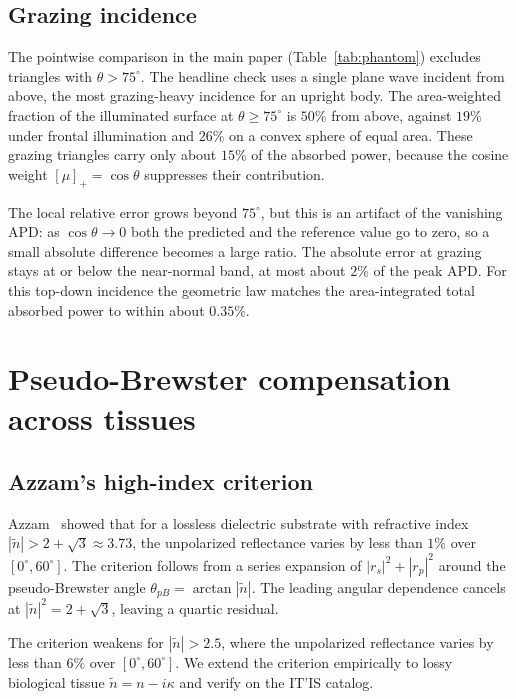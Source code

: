 \documentclass[journal,twocolumn,10pt]{IEEEtran}
\theoremstyle{plain}
\theoremstyle{remark}
\newcommand{\APD}{\mathrm{APD}}
\newcommand{\ntilde}{\tilde{n}}
\newcommand{\pospart}[1]{\left[#1\right]_{+}}
\begin{document}
\subsection{Grazing incidence}\label{si:grazing}

The pointwise comparison in the main paper (Table~\ref{tab:phantom})
excludes triangles with $\theta > 75^\circ$. The headline check uses a
single plane wave incident from above, the most grazing-heavy
incidence for an upright body. The area-weighted fraction of the
illuminated surface at $\theta \ge 75^\circ$ is $50\%$ from above,
against $19\%$ under frontal illumination and $26\%$ on a convex
sphere of equal area. These grazing triangles carry only about $15\%$
of the absorbed power, because the cosine weight
$\pospart{\mu} = \cos\theta$ suppresses their contribution.

The local relative error grows beyond $75^\circ$, but this is an
artifact of the vanishing $\APD$: as $\cos\theta \to 0$ both the
predicted and the reference value go to zero, so a small absolute
difference becomes a large ratio. The absolute error at grazing stays
at or below the near-normal band, at most about $2\%$ of the peak
$\APD$. For this top-down incidence the geometric law matches the
area-integrated total absorbed power to within about $0.35\%$.


\section{Pseudo-Brewster compensation across tissues}\label{si:azzam}

\subsection{Azzam's high-index criterion}
Azzam~\cite{Azzam2015} showed that for a lossless dielectric
substrate with refractive index $|\ntilde| > 2 + \sqrt{3} \approx
3.73$, the unpolarized reflectance varies by less than $1\%$ over
$[0^\circ, 60^\circ]$. The criterion follows from a series expansion
of $|r_s|^2 + |r_p|^2$ around the pseudo-Brewster angle
$\theta_{pB} = \arctan|\ntilde|$. The leading angular dependence
cancels at $|\ntilde|^2 = 2 + \sqrt{3}$, leaving a quartic residual.

The criterion weakens for $|\ntilde| > 2.5$, where the unpolarized
reflectance varies by less than $6\%$ over $[0^\circ, 60^\circ]$.
We extend the criterion empirically to lossy biological tissue
$\ntilde = n - i\kappa$ and verify on the IT'IS catalog.
\end{document}
